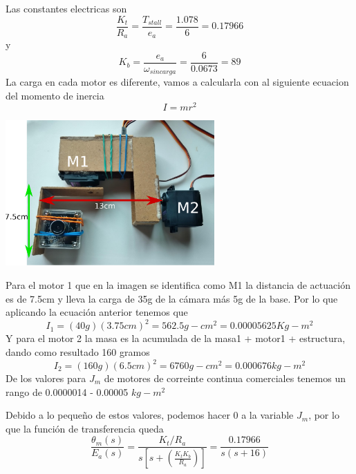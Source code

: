 Las constantes electricas son
\begin{equation}
	\frac{K_t}{R_a} = \frac{T_{stall}}{e_a} = \frac{1.078}{6} = 0.17966
\end{equation}
y
\begin{equation}
	K_b = \frac{e_a}{\omega_{sin carga}} = \frac{6}{0.0673} = 89
\end{equation}
La carga en cada motor es diferente, vamos a calcularla con al siguiente ecuacion del momento de inercia
\begin{equation}
	I = mr^2
\end{equation}
\begin{center}
	\includegraphics[width=0.6\textwidth]{Contenido/Cuerpo/Capitulo5/Fig20.eps}
	\label{Fig4}
\end{center}
Para el motor 1 que en la imagen se identifica como M1 la distancia de actuación es de 7.5cm y lleva la carga de 35g de la cámara más 5g de la base. Por lo que aplicando
la ecuación anterior tenemos que
\begin{equation}
	I_1 = (40g)(3.75cm)^2 = 562.5g-cm^2 = 0.00005625 Kg-m^2
\end{equation}
Y para el motor 2 la masa es la acumulada de la masa1 + motor1 + estructura, dando como resultado 160 gramos
\begin{equation}
	I_2 = (160g)(6.5cm)^2 = 6760 g-cm^2 = 0.000676 kg-m^2
\end{equation}
De los valores para $J_m$ de motores de correinte continua comerciales tenemos un rango de 0.0000014 - 0.00005 $kg-m^2$

Debido a lo pequeño de estos valores, podemos hacer 0 a la variable $J_m$, por lo que la función de transferencia queda
\begin{equation}
	\frac{\theta_m (s)}{E_a(s)} = \frac{K_t / R_a}{s \left[ s +  \left( \frac{K_tK_b}{R_a} \right) \right]} = \frac{0.17966}{s(s+16)}
\end{equation}



